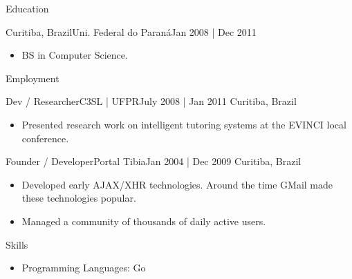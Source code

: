 \documentclass[]{mcdowellcv}
\begin{document}
\makeheader{}

\begin{cvsection}{Education}
	\begin{cvsubsection}{Curitiba, Brazil}{Uni. Federal do Paraná}{Jan 2008 | Dec 2011}
		\begin{itemize}
			\item BS in Computer Science.
		\end{itemize}
	\end{cvsubsection}
\end{cvsection}
\begin{cvsection}{Employment}
	\begin{cvsubsection}{Dev / Researcher}{C3SL | UFPR}{July 2008 | Jan 2011}
		Curitiba, Brazil
		\begin{itemize}%
			\item Presented research work on intelligent tutoring systems at the EVINCI local conference.
		\end{itemize}
	\end{cvsubsection}
	\begin{cvsubsection}{Founder / Developer}{Portal Tibia}{Jan 2004 | Dec 2009}
		Curitiba, Brazil
		\begin{itemize}%
			\item Developed early AJAX/XHR technologies. Around the time GMail made these technologies popular.
			\item Managed a community of thousands of daily active users.
		\end{itemize}
	\end{cvsubsection}
\end{cvsection}
\begin{cvsection}{Skills}
	\begin{cvsubsection}{}{}{}
		\begin{itemize}
			\item Programming Languages:  Go
		\end{itemize}
	\end{cvsubsection}
\end{cvsection}


\
\end{document}
